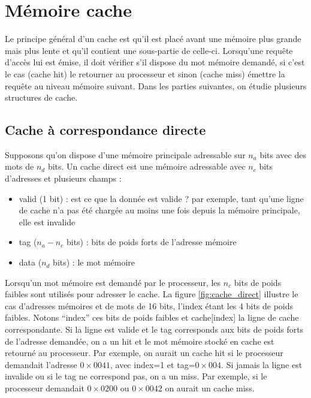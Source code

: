 \section{Mémoire cache}

Le principe général d'un cache est qu'il est placé avant une mémoire plus grande mais plus lente et qu'il contient une sous-partie de celle-ci. Lorsqu'une requête d'accès lui est émise, il doit vérifier s'il dispose du mot mémoire demandé, si c'est le cas (cache hit) le retourner au processeur et sinon (cache miss) émettre la requête au niveau mémoire suivant. Dans les parties suivantes, on étudie plusieurs structures de cache.



\subsection{Cache à correspondance directe}

Supposons qu'on dispose d'une mémoire principale adressable sur $n_a$ bits avec des mots de $n_d$ bits. Un cache direct est une mémoire adressable avec $n_c$ bits d'adresses et plusieurs champs :
\begin{itemize}
\item valid (1 bit) : est ce que la donnée est valide ? par exemple, tant qu'une ligne de cache n'a pas été chargée au moins une fois depuis la mémoire principale, elle est invalide
\item tag ($n_a - n_c$ bits) : bits de poids forts de l'adresse mémoire
\item data ($n_d$ bits) : le mot mémoire  
\end{itemize}

Lorsqu'un mot mémoire est demandé par le processeur, les $n_c$ bits de poids faibles sont utilisés pour adresser le cache. La figure \ref{fig:cache_direct} illustre le cas d'adresses mémoires et de mots de 16 bits, l'index étant les 4 bits de poids faibles. Notons ``index'' ces bits de poids faibles et cache[index] la ligne de cache correspondante. Si la ligne est valide et le tag corresponds aux bits de poids forts de l'adresse demandée, on a un hit et le mot mémoire stocké en cache est retourné au processeur. Par exemple, on aurait un cache hit si le processeur demandait l'adresse $0\times0041$, avec index=1 et tag=$0\times004$. Si jamais la ligne est invalide ou si le tag ne correspond pas, on a un miss. Par exemple, si le processeur demandait $0\times0200$ ou $0\times0042$ on aurait un cache miss.

